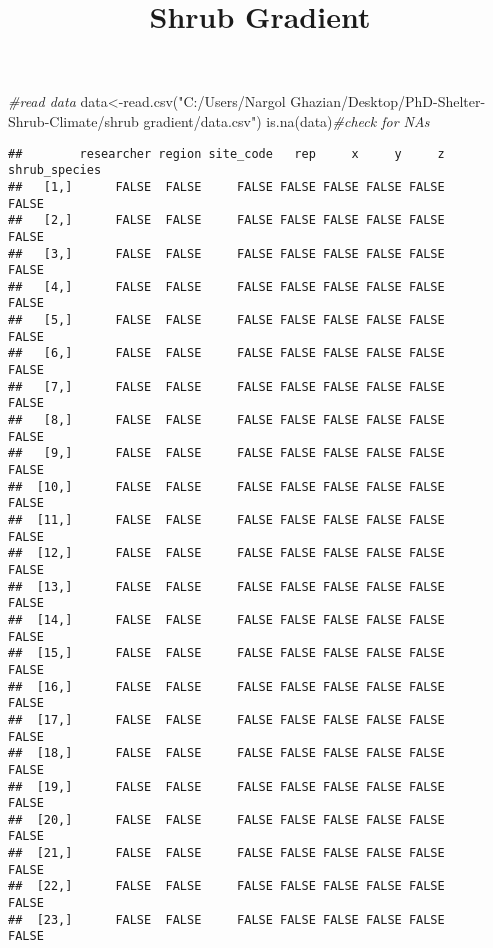 \documentclass[
]{article}
\title{Shrub Gradient}
\author{}
\date{\vspace{-2.5em}}
\newenvironment{Shaded}{\begin{snugshade}}{\end{snugshade}}
\newcommand{\CommentTok}[1]{\textcolor[rgb]{0.56,0.35,0.01}{\textit{#1}}}
\newcommand{\FunctionTok}[1]{\textcolor[rgb]{0.00,0.00,0.00}{#1}}
\newcommand{\NormalTok}[1]{#1}
\newcommand{\OtherTok}[1]{\textcolor[rgb]{0.56,0.35,0.01}{#1}}
\newcommand{\StringTok}[1]{\textcolor[rgb]{0.31,0.60,0.02}{#1}}
\begin{document}
\maketitle

\begin{Shaded}
\begin{Highlighting}[]
\CommentTok{\#read data}
\NormalTok{data}\OtherTok{\textless{}{-}}\FunctionTok{read.csv}\NormalTok{(}\StringTok{"C:/Users/Nargol Ghazian/Desktop/PhD{-}Shelter{-}Shrub{-}Climate/shrub gradient/data.csv"}\NormalTok{)}
\FunctionTok{is.na}\NormalTok{(data)}\CommentTok{\#check for NAs}
\end{Highlighting}
\end{Shaded}

\begin{verbatim}
##        researcher region site_code   rep     x     y     z shrub_species
##   [1,]      FALSE  FALSE     FALSE FALSE FALSE FALSE FALSE         FALSE
##   [2,]      FALSE  FALSE     FALSE FALSE FALSE FALSE FALSE         FALSE
##   [3,]      FALSE  FALSE     FALSE FALSE FALSE FALSE FALSE         FALSE
##   [4,]      FALSE  FALSE     FALSE FALSE FALSE FALSE FALSE         FALSE
##   [5,]      FALSE  FALSE     FALSE FALSE FALSE FALSE FALSE         FALSE
##   [6,]      FALSE  FALSE     FALSE FALSE FALSE FALSE FALSE         FALSE
##   [7,]      FALSE  FALSE     FALSE FALSE FALSE FALSE FALSE         FALSE
##   [8,]      FALSE  FALSE     FALSE FALSE FALSE FALSE FALSE         FALSE
##   [9,]      FALSE  FALSE     FALSE FALSE FALSE FALSE FALSE         FALSE
##  [10,]      FALSE  FALSE     FALSE FALSE FALSE FALSE FALSE         FALSE
##  [11,]      FALSE  FALSE     FALSE FALSE FALSE FALSE FALSE         FALSE
##  [12,]      FALSE  FALSE     FALSE FALSE FALSE FALSE FALSE         FALSE
##  [13,]      FALSE  FALSE     FALSE FALSE FALSE FALSE FALSE         FALSE
##  [14,]      FALSE  FALSE     FALSE FALSE FALSE FALSE FALSE         FALSE
##  [15,]      FALSE  FALSE     FALSE FALSE FALSE FALSE FALSE         FALSE
##  [16,]      FALSE  FALSE     FALSE FALSE FALSE FALSE FALSE         FALSE
##  [17,]      FALSE  FALSE     FALSE FALSE FALSE FALSE FALSE         FALSE
##  [18,]      FALSE  FALSE     FALSE FALSE FALSE FALSE FALSE         FALSE
##  [19,]      FALSE  FALSE     FALSE FALSE FALSE FALSE FALSE         FALSE
##  [20,]      FALSE  FALSE     FALSE FALSE FALSE FALSE FALSE         FALSE
##  [21,]      FALSE  FALSE     FALSE FALSE FALSE FALSE FALSE         FALSE
##  [22,]      FALSE  FALSE     FALSE FALSE FALSE FALSE FALSE         FALSE
##  [23,]      FALSE  FALSE     FALSE FALSE FALSE FALSE FALSE         FALSE

\end{verbatim}
\end{document}
